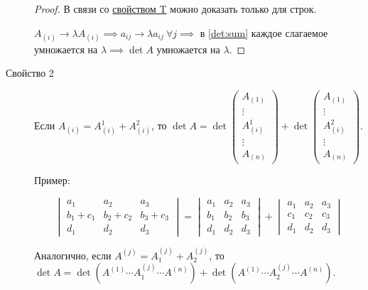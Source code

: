 \begin{description}
    \begin{proof}
        В связи со \hyperref[det:prop_t]{свойством T} можно доказать только для строк.

        $A_{(i)} \to \lambda A_{(i)} \implies a_{ij} \to \lambda a_{ij} \ \forall j \implies $ в \eqref{det:sum} каждое слагаемое умножается на $\lambda \implies \det A$ умножается на $\lambda$.
    \end{proof}

\item[Свойство 2\label{det:prop_2}]
    Если $A_{(i)} = A_{(i)}^1 + A_{(i)}^2$, то $\det A = \det \begin{pmatrix}
        A_{(1)} \\ \vdots \\ A_{(i)}^1 \\ \vdots \\ A_{(n)}
    \end{pmatrix} + \det \begin{pmatrix}
        A_{(1)} \\ \vdots \\ A_{(i)}^2 \\ \vdots \\ A_{(n)}
    \end{pmatrix}$.

    \bigskip
    Пример:

    \begin{equation*}
        \begin{vmatrix}
            a_1 & a_2 & a_3 \\
            b_1 + c_1 & b_2 + c_2 & b_3 + c_3 \\
            d_1 & d_2 & d_3
        \end{vmatrix} = \begin{vmatrix}
            a_1 & a_2 & a_3 \\
            b_1 & b_2 & b_3 \\
            d_1 & d_2 & d_3
        \end{vmatrix} + \begin{vmatrix}
            a_1 & a_2 & a_3 \\
            c_1 & c_2 & c_3 \\
            d_1 & d_2 & d_3
        \end{vmatrix}
    \end{equation*}

    Аналогично, если $A^{(j)} = A^{(j)}_1 + A^{(j)}_2$, то $\det A = \det (A^{(1)} \cdots A^{(j)}_1 \cdots A^{(n)}) + \det (A^{(1)} \cdots A^{(j)}_2 \cdots A^{(n)})$.


\end{description}
